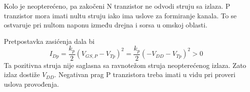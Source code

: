 Kolo je neopterećeno, pa zakočeni N tranzistor ne odvodi struju sa izlaza. P tranzistor mora imati nultu struju iako ima uslove za formiranje kanala. To se ostvaruje pri nultom naponu između drejna i sorsa u omskoj oblasti.

Pretpostavka zasićenja dala bi
\[I_{Dp}=\frac{k_p}2(V_{GS,P}-V_{Tp})^2=\frac{k_p}2(-V_{DD}-V_{Tp})^2>0\]
Ta pozitivna struja nije saglasna sa ravnotežom struja neopterećenog izlaza. Zato izlaz dostiže $V_{DD}$. Negativan prag P tranzistora treba imati u vidu pri proveri uslova provođenja.
